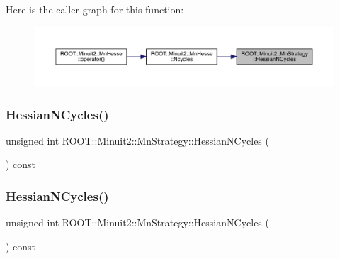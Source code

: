 Here is the caller graph for this function\+:
\nopagebreak
\begin{figure}[H]
\begin{center}
\leavevmode
\includegraphics[width=350pt]{da/de4/classROOT_1_1Minuit2_1_1MnStrategy_ab2342c7f4896a8ed08c9df93fca93066_icgraph}
\end{center}
\end{figure}
\mbox{\label{classROOT_1_1Minuit2_1_1MnStrategy_ab2342c7f4896a8ed08c9df93fca93066}} 
\subsubsection{\texorpdfstring{HessianNCycles()}{HessianNCycles()}\hspace{0.1cm}{\footnotesize\ttfamily [2/3]}}
{\footnotesize\ttfamily unsigned int R\+O\+O\+T\+::\+Minuit2\+::\+Mn\+Strategy\+::\+Hessian\+N\+Cycles (\begin{DoxyParamCaption}{ }\end{DoxyParamCaption}) const\hspace{0.3cm}{\ttfamily [inline]}}

\mbox{\label{classROOT_1_1Minuit2_1_1MnStrategy_ab2342c7f4896a8ed08c9df93fca93066}} 
\subsubsection{\texorpdfstring{HessianNCycles()}{HessianNCycles()}\hspace{0.1cm}{\footnotesize\ttfamily [3/3]}}
{\footnotesize\ttfamily unsigned int R\+O\+O\+T\+::\+Minuit2\+::\+Mn\+Strategy\+::\+Hessian\+N\+Cycles (\begin{DoxyParamCaption}{ }\end{DoxyParamCaption}) const\hspace{0.3cm}{\ttfamily [inline]}}

